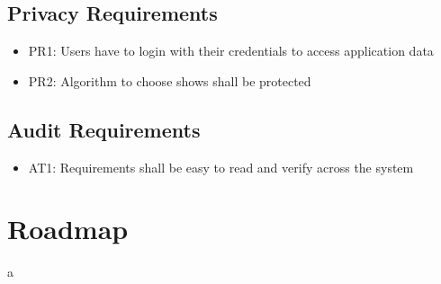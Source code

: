 \documentclass[12pt]{article}
\begin{document}
\subsection{Privacy Requirements}
\begin{itemize}
	\item PR1: Users have to login with their credentials to access application data
	\item PR2: Algorithm to choose shows shall be protected
\end{itemize}

\subsection{Audit Requirements}
\begin{itemize}
	\item AT1: Requirements shall be easy to read and verify across the system
\end{itemize}

\section{Roadmap}
a
\end{document}
